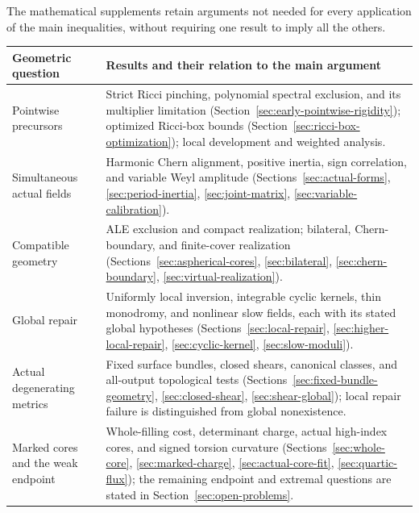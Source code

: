 \documentclass[10pt,a4paper]{article}
\theoremstyle{definition}
\theoremstyle{remark}
\numberwithin{equation}{section}
\begin{document}
The mathematical supplements retain
arguments not needed for every application of the main inequalities,
without requiring one result to imply all the others.
\begin{center}
\small
\begin{tabularx}{\textwidth}{@{}p{}X@{}}
\toprule
Geometric question & Results and their relation to the main argument\\
\midrule
Pointwise precursors &
Strict Ricci pinching, polynomial spectral exclusion, and its multiplier
limitation (Section~\ref{sec:early-pointwise-rigidity}); optimized
Ricci-box bounds (Section~\ref{sec:ricci-box-optimization}); local
development and weighted analysis.\\
Simultaneous actual fields &
Harmonic Chern alignment, positive inertia, sign correlation, and
variable Weyl amplitude (Sections~\ref{sec:actual-forms},
\ref{sec:period-inertia}, \ref{sec:joint-matrix},
\ref{sec:variable-calibration}).\\
Compatible geometry &
ALE exclusion and compact realization; bilateral, Chern-boundary,
and finite-cover realization (Sections~\ref{sec:aspherical-cores},
\ref{sec:bilateral}, \ref{sec:chern-boundary},
\ref{sec:virtual-realization}).\\
Global repair &
Uniformly local inversion, integrable cyclic kernels, thin monodromy,
and nonlinear slow fields, each with its stated global hypotheses
(Sections~\ref{sec:local-repair}, \ref{sec:higher-local-repair},
\ref{sec:cyclic-kernel}, \ref{sec:slow-moduli}).\\
Actual degenerating metrics &
Fixed surface bundles, closed shears, canonical classes, and
all-output topological tests (Sections~\ref{sec:fixed-bundle-geometry},
\ref{sec:closed-shear}, \ref{sec:shear-global}); local repair
failure is distinguished from global nonexistence.\\
Marked cores and the weak endpoint &
Whole-filling cost, determinant charge, actual high-index cores,
and signed torsion curvature (Sections~\ref{sec:whole-core},
\ref{sec:marked-charge}, \ref{sec:actual-core-fit},
\ref{sec:quartic-flux}); the remaining endpoint and extremal
questions are stated in Section~\ref{sec:open-problems}.\\
\bottomrule
\end{tabularx}
\end{center}
\clearpage
\end{document}
